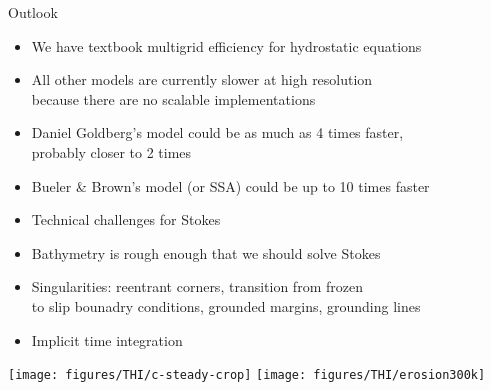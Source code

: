 \documentclass{beamer}
\begin{document}
\begin{frame}{Outlook}
  \begin{block}{}
    \begin{itemize}
    \item We have textbook multigrid efficiency for hydrostatic equations
    \item All other models are currently slower at high resolution \\ \quad because there are no scalable implementations
    \item Daniel Goldberg's model could be as much as 4 times faster, \\ \quad probably closer to 2 times
    \item Bueler \& Brown's model (or SSA) could be up to 10 times faster
    \item Technical challenges for Stokes
    \item Bathymetry is rough enough that we should solve Stokes
    \item Singularities: reentrant corners, transition from frozen \\ \quad 
      to slip bounadry conditions, grounded margins, grounding lines
    \item Implicit time integration
    \end{itemize}    
  \end{block}
\end{frame}

\begin{frame}
  \texttt{[image: figures/THI/c-steady-crop]}
  \texttt{[image: figures/THI/erosion300k]}
\end{frame}
\end{document}
